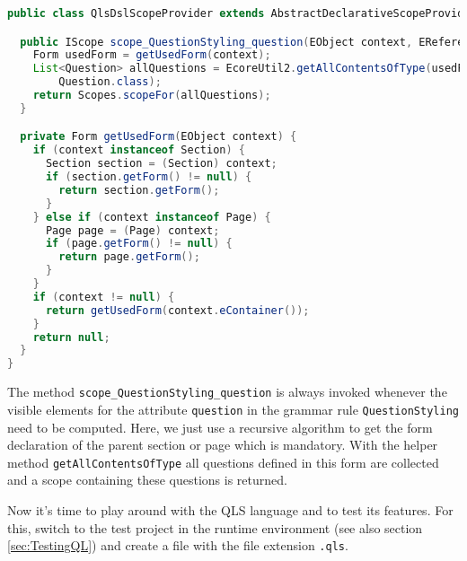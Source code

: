 \begin{lstlisting}[language=Java]
public class QlsDslScopeProvider extends AbstractDeclarativeScopeProvider {

  public IScope scope_QuestionStyling_question(EObject context, EReference reference) {
    Form usedForm = getUsedForm(context);
    List<Question> allQuestions = EcoreUtil2.getAllContentsOfType(usedForm,
        Question.class);
    return Scopes.scopeFor(allQuestions);
  }

  private Form getUsedForm(EObject context) {
    if (context instanceof Section) {
      Section section = (Section) context;
      if (section.getForm() != null) {
        return section.getForm();
      }
    } else if (context instanceof Page) {
      Page page = (Page) context;
      if (page.getForm() != null) {
        return page.getForm();
      }
    }
    if (context != null) {
      return getUsedForm(context.eContainer());
    }
    return null;
  }
}
\end{lstlisting}

The method \texttt{scope\_QuestionStyling\_question} is always invoked whenever the visible
elements for the attribute \texttt{question} in the grammar rule \texttt{QuestionStyling} 
need to be computed. Here, we just use a recursive algorithm to get the form declaration
of the parent section or page which is mandatory. With the helper method \texttt{getAllContentsOfType}
all questions defined in this form are collected and a scope containing these questions is returned.

Now it's time to play around with the QLS language and to test its features. For this,
switch to the test project in the runtime environment (see also section \ref{sec:TestingQL})
and create a file with the file extension \texttt{.qls}.